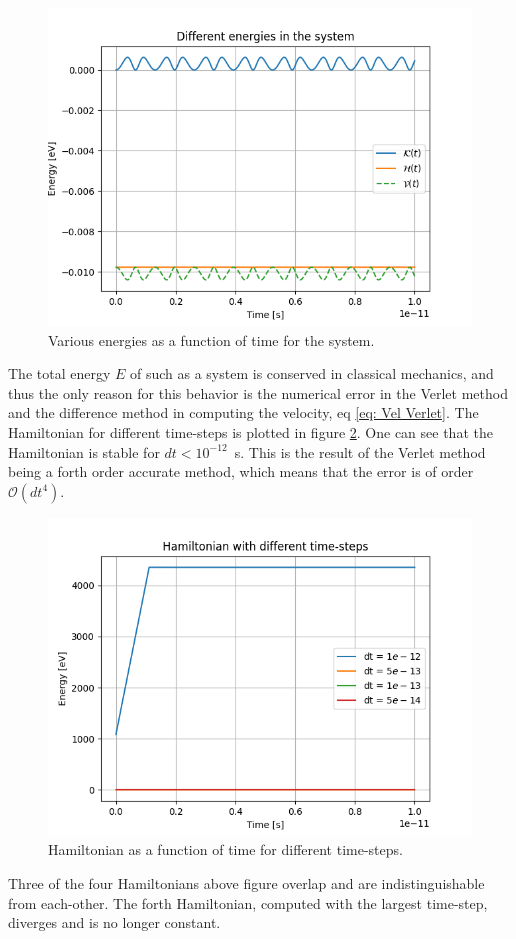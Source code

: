 \documentclass[a4paper]{article}
\begin{document}
\begin{figure}[H]
   \centering
   \includegraphics[scale = 0.55]{Different energies in the system.png} 
   \caption{Various energies as a function of time for the system.}
   \label{fig: Energy of the atoms}
\end{figure}\noindent
The total energy $E$ of such as a system is conserved in classical mechanics, and thus the only reason for this behavior is the numerical error in the Verlet method and the difference method in computing the velocity, eq \eqref{eq: Vel Verlet}.
The Hamiltonian for different time-steps is plotted in figure \ref{fig: Hamiltonian with different time-steps}. One can see that the Hamiltonian is stable for $dt< 10^{-12}$~s.
This is the result of the Verlet method being a forth order accurate method, which means that the error is of order $\mathcal{O}(dt^4)$.
\begin{figure}[H]
    \centering
    \includegraphics[scale = .5]{Hamiltonian with different time-steps.png}
    \caption{Hamiltonian as a function of time for different time-steps.}
    \label{fig: Hamiltonian with different time-steps}
\end{figure}\noindent
Three of the four Hamiltonians above figure overlap and are indistinguishable from each-other. The forth Hamiltonian, computed with the largest time-step, diverges and is no longer constant.
\end{document}
